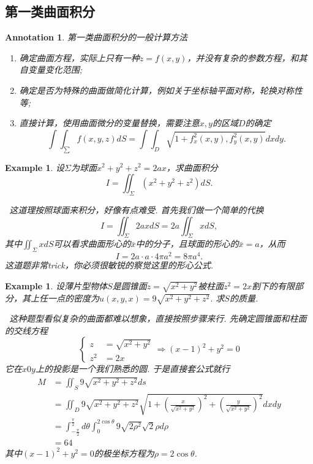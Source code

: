 \documentclass{article}
\newtheorem{example}[theorem]{Example}
\newtheorem{annotation}[theorem]{Annotation}
\newcommand{\hints}{{\color{blue} \text{hints}}}
\begin{document}
\subsection{第一类曲面积分}

\begin{annotation}
\rm 第一类曲面积分的一般计算方法
\begin{enumerate}
	\item 确定曲面方程，实际上只有一种$z=f(x,y)$，并没有复杂的参数方程，和其自变量变化范围; 
	\item 确定是否为特殊的曲面做简化计算，例如关于坐标轴平面对称，轮换对称性等;
	\item 直接计算，使用曲面微分的变量替换，需要注意$x,y$的区域$D$的确定
	$$
\int\int_\sum f(x,y,z)dS = \int\int_D\sqrt{1+f_x^2(x,y),f_y^2(x,y)}dxdy.
$$
\end{enumerate}
\end{annotation}

\begin{example}
\rm 设$\Sigma$为球面$x^2 + y^2 + z^2 = 2ax$，求曲面积分
$$
I =\iint_{\Sigma} (x^2 + y^2 + z^2)dS.
$$

\hints\ 这道理按照球面来积分，好像有点难受. 首先我们做一个简单的代换
$$
I = \iint_{\Sigma} 2ax dS = 2a \iint_{\Sigma} xdS,
$$
其中$\iint_{\Sigma} xdS$可以看求曲面形心的$\bar{x}$中的分子，且球面的形心的$\bar{x} = a$，从而
$$
I = 2a \cdot a \cdot 4\pi a^2 = 8\pi a^4. 
$$
这道题非常trick，你必须很敏锐的察觉这里的形心公式. 
\end{example}

\begin{example}
\rm 设薄片型物体$S$是圆锥面$z=\sqrt{x^2+y^2}$被柱面$z^2 = 2x$割下的有限部分，其上任一点的密度为$u(x,y,x)=9\sqrt{x^2 + y^2 + z^2}$. 求$S$的质量. 

\hints\ 这种题型看似复杂的曲面都难以想象，直接按照步骤来行. 先确定圆锥面和柱面的交线方程
$$
\left\{
\begin{aligned}
z&=\sqrt{x^2+y^2} \\
z^2 &= 2x
\end{aligned} \right.  \Rightarrow 
(x-1)^2 + y^2 = 0
$$
它在$x0y$上的投影是一个我们熟悉的圆. 于是直接套公式就行
$$
\begin{aligned}
M &= \iint_S 9\sqrt{x^2 + y^2 + z^2}ds \\
 &=  \iint_D 9\sqrt{x^2 + y^2 + z^2}\sqrt{1 + \left(\frac{x}{\sqrt{x^2 + y^2}}\right)^2 + \left(\frac{y}{\sqrt{x^2 + y^2}}\right)^2}dxdy \\
 &= \int_{-\frac{\pi}{2}}^{\frac{\pi}{2}}d\theta \int_0^{2\cos\theta} 9\sqrt{2\rho^2}\sqrt{2} \rho d\rho \\
 &= 64 
\end{aligned}
$$
其中$(x-1)^2 + y^2=0$的极坐标方程为$\rho = 2\cos\theta$. 
\end{example}
\end{document}
